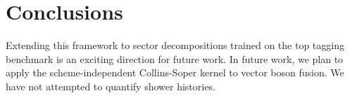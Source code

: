 \section{Conclusions}\label{sec:conclusions}

Extending this framework to sector decompositions trained on the top
tagging benchmark is an exciting direction for future work. In future
work, we plan to apply the scheme-independent Collins-Soper kernel to
vector boson fusion. We have not attempted to quantify shower histories.


